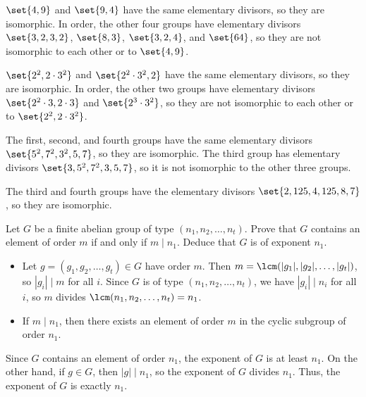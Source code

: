 \begin{solalph}
    \item $\set{4, 9}$ and $\set{9, 4}$ have the same elementary divisors, so they are isomorphic. In order, the other four groups have elementary divisors $\set{3, 2, 3, 2}$, $\set{8, 3}$, $\set{3, 2, 4}$, and $\set{64}$, so they are not isomorphic to each other or to $\set{4, 9}$.
    \item $\set{2^2, 2 \cdot 3^2}$ and $\set{2^2 \cdot 3^2, 2}$ have the same elementary divisors, so they are isomorphic. In order, the other two groups have elementary divisors $\set{2^2 \cdot 3, 2 \cdot 3}$ and $\set{2^3 \cdot 3^2}$, so they are not isomorphic to each other or to $\set{2^2, 2 \cdot 3^2}$.
    \item The first, second, and fourth groups have the same elementary divisors $\set{5^2, 7^2, 3^2, 5, 7}$, so they are isomorphic. The third group has elementary divisors $\set{3, 5^2, 7^2, 3, 5, 7}$, so it is not isomorphic to the other three groups.
    \item The third and fourth groups have the elementary divisors $\set{2, 125, 4, 125, 8, 7}$, so they are isomorphic.
\end{solalph}

\begin{exercise}\label{ex5.2.5}
    Let $G$ be a finite abelian group of type $(n_1, n_2, \ldots, n_t)$. Prove that $G$ contains an element of order $m$ if and only if $m \mid n_1$. Deduce that $G$ is of exponent $n_1$.
\end{exercise}

\begin{sol}
    \leavevmode
    \begin{itemize}
        \item[\rightimp] Let $g = (g_1, g_2, \ldots, g_t) \in G$ have order $m$. Then $m = \lcm(|g_1|, |g_2|, \ldots, |g_t|)$, so $|g_i| \mid m$ for all $i$. Since $G$ is of type $(n_1, n_2, \ldots, n_t)$, we have $|g_i| \mid n_i$ for all $i$, so $m$ divides $\lcm(n_1, n_2, \ldots, n_t) = n_1$.
        \item[\leftimp] If $m \mid n_1$, then there exists an element of order $m$ in the cyclic subgroup of order $n_1$.
    \end{itemize}
    Since $G$ contains an element of order $n_1$, the exponent of $G$ is at least $n_1$. On the other hand, if $g \in G$, then $|g| \mid n_1$, so the exponent of $G$ divides $n_1$. Thus, the exponent of $G$ is exactly $n_1$.
\end{sol}

